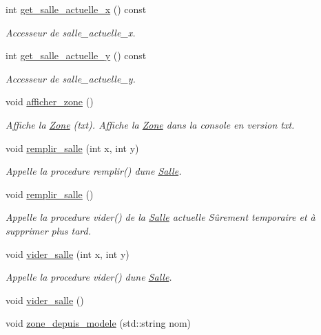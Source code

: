 \begin{DoxyCompactItemize}
int \hyperlink{classZone_a5cba037223549a19e4717c9a502895ca}{get\+\_\+salle\+\_\+actuelle\+\_\+x} () const 
\begin{DoxyCompactList}\small\item\em Accesseur de {\itshape salle\+\_\+actuelle\+\_\+x}. \end{DoxyCompactList}\item 
int \hyperlink{classZone_a481d145df776bb245a223e6848b9a6d6}{get\+\_\+salle\+\_\+actuelle\+\_\+y} () const 
\begin{DoxyCompactList}\small\item\em Accesseur de {\itshape salle\+\_\+actuelle\+\_\+y}. \end{DoxyCompactList}\item 
void \hyperlink{classZone_ae7fc481efb7e4bb2fc28bb5da0bbaf90}{afficher\+\_\+zone} ()
\begin{DoxyCompactList}\small\item\em Affiche la \hyperlink{classZone}{Zone} (txt). Affiche la \hyperlink{classZone}{Zone} dans la console en version txt. \end{DoxyCompactList}\item 
void \hyperlink{classZone_ae97ba3cc2a452803a66dbd3c0c84852b}{remplir\+\_\+salle} (int x, int y)
\begin{DoxyCompactList}\small\item\em Appelle la procedure remplir() d\textquotesingle{}une \hyperlink{classSalle}{Salle}. \end{DoxyCompactList}\item 
void \hyperlink{classZone_a76284023033d6b67f933b4656a8eb761}{remplir\+\_\+salle} ()
\begin{DoxyCompactList}\small\item\em Appelle la procedure vider() de la \hyperlink{classSalle}{Salle} actuelle Sûrement temporaire et à supprimer plus tard. \end{DoxyCompactList}\item 
void \hyperlink{classZone_a296f45a66db2f5ad565d15274f628e72}{vider\+\_\+salle} (int x, int y)
\begin{DoxyCompactList}\small\item\em Appelle la procedure vider() d\textquotesingle{}une \hyperlink{classSalle}{Salle}. \end{DoxyCompactList}\item 
void \hyperlink{classZone_a0f61f5c9028db56ef251371818b31b35}{vider\+\_\+salle} ()
\item 
void \hyperlink{classZone_a411c8abc6ba0b85239bea9aa2daac45c}{zone\+\_\+depuis\+\_\+modele} (std\+::string nom)

\end{DoxyCompactItemize}

